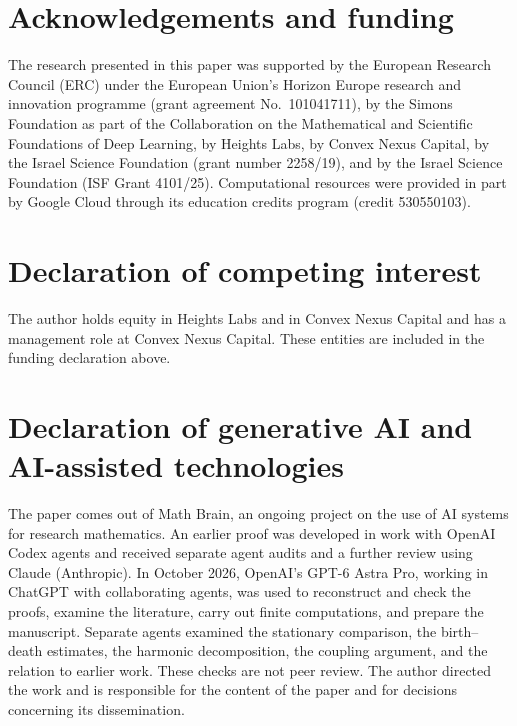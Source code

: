 \section*{Acknowledgements and funding}
The research presented in this paper was supported by the European Research
Council (ERC) under the European Union's Horizon Europe research and
innovation programme (grant agreement No.~101041711), by the Simons
Foundation as part of the Collaboration on the Mathematical and Scientific
Foundations of Deep Learning, by Heights Labs, by Convex Nexus Capital, by
the Israel Science Foundation (grant number 2258/19), and by the Israel
Science Foundation (ISF Grant 4101/25). Computational resources were
provided in part by Google Cloud through its education credits program
(credit 530550103).

\section*{Declaration of competing interest}
The author holds equity in Heights Labs and in Convex Nexus Capital and
has a management role at Convex Nexus Capital. These entities are included
in the funding declaration above.

\section*{Declaration of generative AI and AI-assisted technologies}
The paper comes out of Math Brain, an ongoing project on the use of AI systems for research mathematics. An earlier proof was developed in work with OpenAI Codex agents and received separate agent audits and a further review using Claude (Anthropic). In October 2026, OpenAI's GPT-6 Astra Pro, working in ChatGPT with collaborating agents, was used to reconstruct and check the proofs, examine the literature, carry out finite computations, and prepare the manuscript. Separate agents examined the stationary comparison, the birth--death estimates, the harmonic decomposition, the coupling argument, and the relation to earlier work. These checks are not peer review. The author directed the work and is responsible for the content of the paper and for decisions concerning its dissemination.
